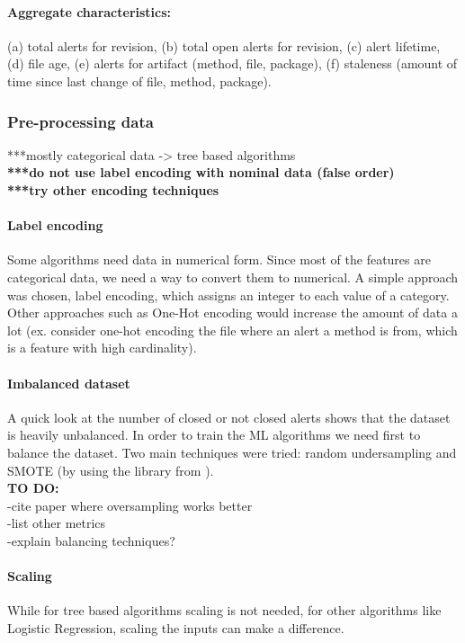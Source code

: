 \paragraph{Aggregate characteristics:} (a) total alerts for revision, (b) total open alerts for revision, (c) alert lifetime, (d) file age, (e) alerts for artifact (method, file, package), (f) staleness (amount of time since last change of file, method, package).


\subsubsection{Pre-processing data}

***mostly categorical data -> tree based algorithms\\
\textbf{***do not use label encoding with nominal data (false order)}\\
\textbf{***try other encoding techniques}

\paragraph{Label encoding} Some algorithms need data in numerical form. Since most of the features are categorical data, we need a way to convert them to numerical. A simple approach was chosen, label encoding, which assigns an integer to each value of a category. Other approaches such as One-Hot encoding would increase the amount of data a lot (ex. consider one-hot encoding the file where an alert a method is from, which is a feature with high cardinality).

\paragraph{Imbalanced dataset} A quick look at the number of closed or not closed alerts shows that the dataset is heavily unbalanced. In order to train the ML algorithms we need first to balance the dataset. Two main techniques were tried: random undersampling and SMOTE (by using the library from \cite{imblearn}).\\

\textbf{TO DO:}\\
-cite paper where oversampling works better\\
-list other metrics\\
-explain balancing techniques?

\paragraph{Scaling} While for tree based algorithms scaling is not needed, for other algorithms like Logistic Regression, scaling the inputs can make a difference.

